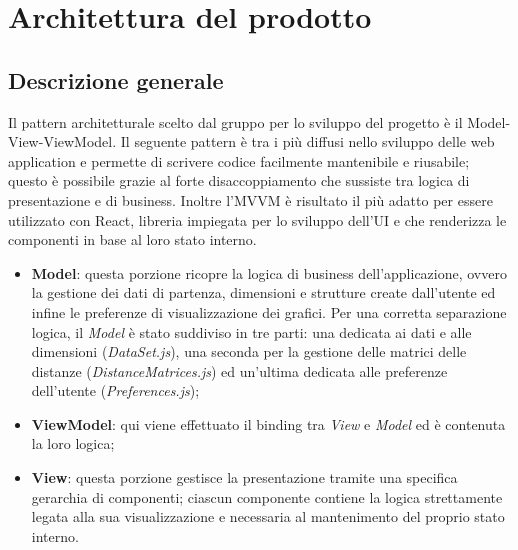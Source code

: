\section{Architettura del prodotto}
\subsection{Descrizione generale}
Il pattern architetturale scelto dal gruppo per lo sviluppo del progetto è il Model-View-ViewModel. Il seguente pattern è tra i più diffusi nello sviluppo delle web application e permette di scrivere codice facilmente mantenibile e riusabile; questo è possibile grazie al forte disaccoppiamento che sussiste tra logica di presentazione e di business. Inoltre l'MVVM è risultato il più adatto per essere utilizzato con React, libreria impiegata per lo sviluppo dell'UI e che renderizza le componenti in base al loro stato interno.
\begin{itemize}
\item \textbf{Model}: questa porzione ricopre la logica di business dell'applicazione, ovvero la gestione dei dati di partenza, dimensioni e strutture create dall'utente ed infine le preferenze di visualizzazione dei grafici. Per una corretta separazione logica, il \textit{Model} è stato suddiviso in tre parti: una dedicata ai dati e alle dimensioni (\textit{DataSet.js}), una seconda per la gestione delle matrici delle distanze (\textit{DistanceMatrices.js}) ed un'ultima dedicata alle preferenze dell'utente (\textit{Preferences.js});

\item \textbf{ViewModel}: qui viene effettuato il binding tra \textit{View} e \textit{Model} ed è contenuta la loro logica;

\item \textbf{View}: questa porzione gestisce la presentazione tramite una specifica gerarchia di componenti; ciascun componente contiene la logica strettamente legata alla sua visualizzazione e necessaria al mantenimento del proprio stato interno.
\end{itemize}

